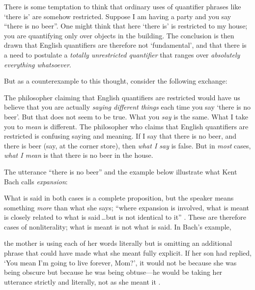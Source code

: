 \documentclass[11pt]{article}
\newenvironment{squote}{%
\begin{spacing}{1}
       	\begin{list}{}{%
\setlength{\labelwidth}{0pt}%
\rightmargin\leftmargin%
}
\item\relax
}{%
\end{list}%
\end{spacing}
}
\begin{document}
\begin{spacing}{1.25}
There is some temptation to think that ordinary uses of quantifier
phrases like `there is' are somehow restricted.  Suppose I am having a
party and you say ``there is no beer''.  One might think that here
`there is' is restricted to my house; you are quantifying only over
objects in the building.  The conclusion is then drawn that English
quantifiers are therefore not `fundamental', and that there is a need
to postulate a {\em totally unrestricted quantifier} that ranges over
{\em absolutely everything whatsoever}.

But as a counterexample to this thought, consider the following
exchange:







The philosopher claiming that English quantifiers are restricted would
have us believe that you are actually {\em saying different things}
each time you say `there is no beer'.  But that does not seem to be
true.  What you {\em say} is the same.  What I take you to {\em mean}
is different.  The philosopher who claims that English quantifiers are
restricted is confusing saying and meaning.  If I say that there is no
beer, and there is beer (say, at the corner store), then {\em what I
  say} is false.  But in {\em most} cases, {\em what I mean} is that
there is no beer in the house.

The utterance ``there is no beer'' and the example below illustrate
what Kent Bach calls {\em expansion}:


What is said in both cases is a complete proposition, but the speaker
means something {\em more} than what she says; ``where expansion is
involved, what is meant is closely related to what is said\,\ldots but
is not identical to it'' \citep{bach1994}.  These are therefore cases
of nonliterality; what is meant is not what is said.  In Bach's
example,

\begin{squote}
the mother is using each of her words literally but is omitting an
additional phrase that could have made what she meant fully explicit.
If her son had replied, `You mean I'm going to live forever, Mom?', it
would not be because she was being obscure but because he was being
obtuse---he would be taking her utterance strictly and literally, not
as she meant it \citeyearpar{bach1994}.
\end{squote}


\end{spacing}
\end{document}
